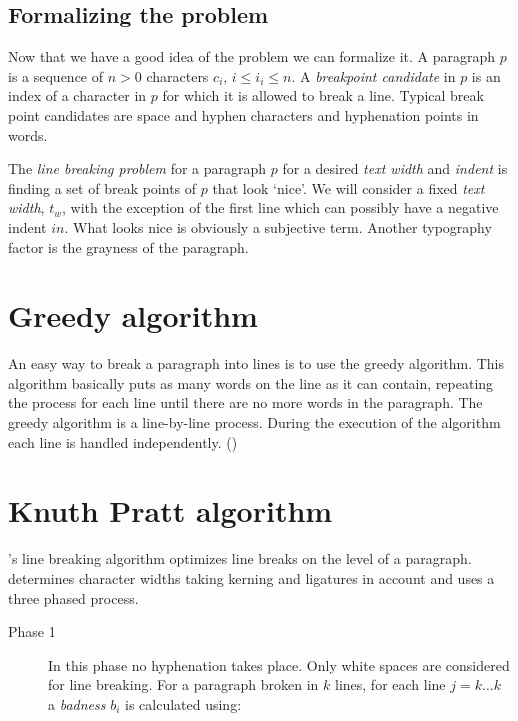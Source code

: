 {{\subsection{Formalizing the problem}

Now that we have a good idea of the problem we can formalize it. A paragraph $p$ is a sequence of $n>0$ characters $c_i$,  $i\leq i_i \leq n$.
A \textit{breakpoint candidate} in $p$ is an index of a character in $p$ for which it is allowed to break a line. Typical break point candidates are space and hyphen characters and hyphenation points in words.

The \textit{line breaking problem} for a paragraph $p$ for a desired \textit{text width} and \textit{indent} is finding a set of break points of $p$ that look `nice'. We will consider a fixed \textit{text width}, $t_w$, with the exception of the first line which can possibly have a negative indent $in$. What looks nice is obviously a subjective term. Another typography factor is the grayness of the paragraph. 

\section{Greedy algorithm}

An easy way to break a paragraph into lines is to use the greedy algorithm. This algorithm basically puts as many 
words on the line as it can contain, repeating the process for each line until there are no more words in the paragraph. The greedy algorithm is a line-by-line process. During the execution of the algorithm each line is handled independently. (\citep{elyaakoubi})



\section{Knuth Pratt algorithm}
\tex's line breaking algorithm optimizes line breaks on the level of a paragraph. \tex determines character widths taking kerning and ligatures in account and uses a three phased process. 

\begin{description}
\item[Phase 1] In this phase no hyphenation takes place. Only white spaces are considered  for line breaking. For a paragraph broken in $k$ lines, for each line $j=k\ldots k$  a \textit{badness} $b_i$ is calculated using:


\end{description}}}
